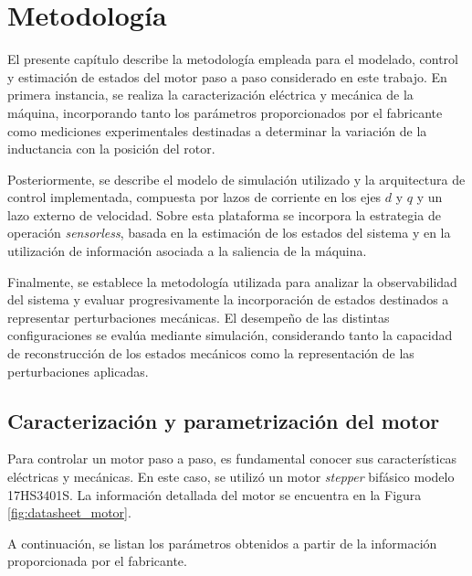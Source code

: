 
\chapter{Metodología}
\label{cap:Metodología}
El presente capítulo describe la metodología empleada para el modelado,
control y estimación de estados del motor paso a paso considerado en este
trabajo. En primera instancia, se realiza la caracterización eléctrica y
mecánica de la máquina, incorporando tanto los parámetros proporcionados
por el fabricante como mediciones experimentales destinadas a determinar
la variación de la inductancia con la posición del rotor.

Posteriormente, se describe el modelo de simulación utilizado y la
arquitectura de control implementada, compuesta por lazos de corriente en
los ejes $d$ y $q$ y un lazo externo de velocidad. Sobre esta plataforma
se incorpora la estrategia de operación \textit{sensorless}, basada en la
estimación de los estados del sistema y en la utilización de información
asociada a la saliencia de la máquina.

Finalmente, se establece la metodología utilizada para analizar la
observabilidad del sistema y evaluar progresivamente la incorporación de
estados destinados a representar perturbaciones mecánicas. El desempeño
de las distintas configuraciones se evalúa mediante simulación,
considerando tanto la capacidad de reconstrucción de los estados
mecánicos como la representación de las perturbaciones aplicadas.


\section{Caracterización y parametrización del motor}

Para controlar un motor paso a paso, es fundamental conocer sus
características eléctricas y mecánicas. En este caso, se utilizó un motor
\textit{stepper} bifásico modelo 17HS3401S. La información detallada del
motor se encuentra en la Figura \ref{fig:datasheet_motor}.

A continuación, se listan los parámetros obtenidos a partir de la
información proporcionada por el fabricante.


